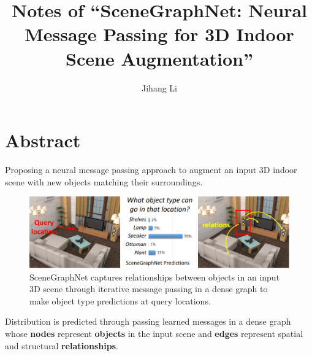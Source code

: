 \documentclass[10pt]{article}
\title{Notes of ``SceneGraphNet: Neural Message Passing for 3D Indoor Scene Augmentation''}
\author{Jihang Li}
\begin{document}
\maketitle
\tableofcontents

\section*{Abstract}%
\label{sec:abstract}
Proposing a neural message passing approach to augment an input 3D indoor scene
with new objects matching their surroundings.
%
\begin{figure}[htpb]
  \centering
  \includegraphics[width=0.8\linewidth]{fig_1.png}
  \caption{SceneGraphNet captures relationships between objects in an input 3D
    scene through iterative message passing in a dense graph to make object
    type predictions at query locations.}%
  \label{fig:1}
\end{figure}
%
Distribution is predicted through passing learned messages in a dense graph
whose \textbf{nodes} represent \textbf{objects} in the input scene and
\textbf{edges} represent spatial and structural \textbf{relationships}.


\end{document}

